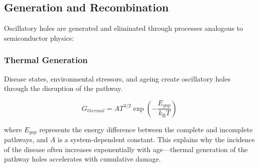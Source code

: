 \documentclass{article}
\newcommand{\kB}{k_\mathrm{B}}
\theoremstyle{definition}
\theoremstyle{remark}
\begin{document}
\subsection{Generation and Recombination}

Oscillatory holes are generated and eliminated through processes analogous to semiconductor physics:

\subsubsection{Thermal Generation}

Disease states, environmental stressors, and ageing create oscillatory holes through the disruption of the pathway.

\begin{equation}
G_{thermal} = AT^{3/2} \exp\left(-\frac{E_{gap}}{\kB T}\right)
\label{eq:thermal_generation}
\end{equation}

where $E_{gap}$ represents the energy difference between the complete and incomplete pathways, and $A$ is a system-dependent constant. This explains why the incidence of the disease often increases exponentially with age—thermal generation of the pathway holes accelerates with cumulative damage.
\end{document}
